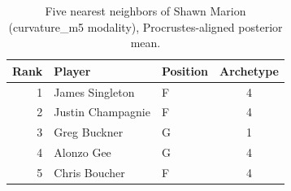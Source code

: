 \begin{table}[htbp]
  \centering\small
  \begin{tabular}{rllc}
    \toprule
    Rank & Player & Position & Archetype \\
    \midrule
    1 & James Singleton & F & 4 \\
    2 & Justin Champagnie & F & 4 \\
    3 & Greg Buckner & G & 1 \\
    4 & Alonzo Gee & G & 4 \\
    5 & Chris Boucher & F & 4 \\
    \bottomrule
  \end{tabular}
  \caption{Five nearest neighbors of Shawn Marion (curvature_m5 modality), Procrustes-aligned posterior mean.}
  \label{tab:Shawn_Marion_neighbors_curvature_m5}
\end{table}


